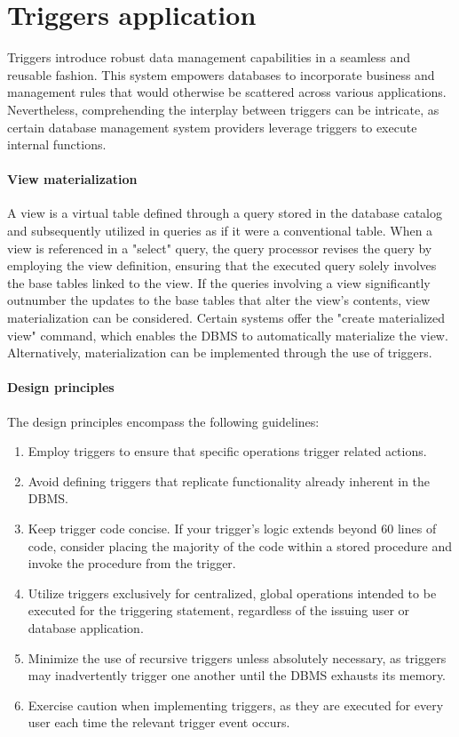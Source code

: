 \section{Triggers application}

Triggers introduce robust data management capabilities in a seamless and reusable fashion. 
This system empowers databases to incorporate business and management rules that would otherwise be scattered across various applications. 
Nevertheless, comprehending the interplay between triggers can be intricate, as certain database management system  providers leverage triggers to execute internal functions.

\paragraph*{View materialization}
A view is a virtual table defined through a query stored in the database catalog and subsequently utilized in queries as if it were a conventional table. 
When a view is referenced in a "select" query, the query processor revises the query by employing the view definition, ensuring that the executed query solely involves the base tables linked to the view.   
If the queries involving a view significantly outnumber the updates to the base tables that alter the view's contents, view materialization can be considered.  
Certain systems offer the "create materialized view" command, which enables the DBMS to automatically materialize the view. 
Alternatively, materialization can be implemented through the use of triggers.

\paragraph*{Design principles}
The design principles encompass the following guidelines:
\begin{enumerate}
    \item Employ triggers to ensure that specific operations trigger related actions.
    \item Avoid defining triggers that replicate functionality already inherent in the DBMS. 
    \item Keep trigger code concise. 
        If your trigger's logic extends beyond 60 lines of code, consider placing the majority of the code within a stored procedure and invoke the procedure from the trigger.
    \item Utilize triggers exclusively for centralized, global operations intended to be executed for the triggering statement, regardless of the issuing user or database application.
    \item Minimize the use of recursive triggers unless absolutely necessary, as triggers may inadvertently trigger one another until the DBMS exhausts its memory.
    \item Exercise caution when implementing triggers, as they are executed for every user each time the relevant trigger event occurs.
\end{enumerate}

